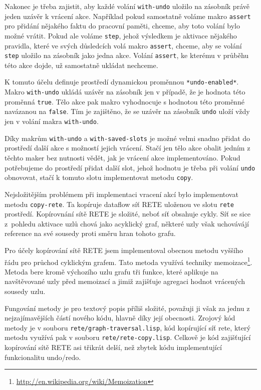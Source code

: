 Nakonec je třeba zajistit, aby každé volání \verb|with-undo| uložilo na zásobník
právě jeden uzávěr k vrácení akce. Například pokud samostatně voláme makro
\verb|assert| pro přidání nějakého faktu do pracovní paměti, chceme, aby toto volání
bylo možné vrátit. Pokud ale voláme \verb|step|, jehož výsledkem je aktivace
nějakého pravidla, které ve svých důsledcích volá makro \verb|assert|, chceme,
aby se volání \verb|step| uložilo na zásobník jako jedna akce. Volání
\verb|assert|, ke kterému v průběhu této akce dojde, už samostatně ukládat
nechceme.

K tomuto účelu definuje prostředí dynamickou proměnnou \verb|*undo-enabled*|.
Makro \verb|with-undo| ukládá uzávěr na zásobník jen v případě, že je hodnota
této proměnná \verb|true|. Tělo akce pak makro vyhodnocuje s hodnotou této
proměnné navázanou na \verb|false|. Tím je zajištěno, že se uzávěr na zásobník
\verb|undo| uloží vždy jen v  volání makra \verb|with-undo|.

Díky makrům \verb|with-undo| a \verb|with-saved-slots| je možné velmi snadno
přidat do prostředí další akce s možností jejich vrácení. Stačí jen tělo akce
obalit jedním z těchto maker bez nutnosti vědět, jak je vrácení akce
implementováno. Pokud potřebujeme do prostředí přidat další slot, jehož hodnotu
je třeba při volání \verb|undo| obnovovat, stačí k tomuto slotu implementovat
metodu \verb|copy|.

Nejsložitějším problémem při implementaci vracení akcí bylo implementovat metodu
\verb|copy-rete|. Ta kopíruje dataflow síť RETE uloženou ve slotu \verb|rete|
prostředí. Kopírovnání sítě RETE je složité, neboť síť obsahuje cykly. Síť se
sice z~pohledu aktivace uzlů chová jako acyklický graf, některé uzly však
uchovávájí reference na své sousedy proti směru hran tohoto grafu.

Pro účely kopírování sítě RETE jsem implementoval obecnou metodu vyššího řádu
pro průchod cyklickým grafem. Tato metoda využívá techniky
memoizace\footnote{\url{http://en.wikipedia.org/wiki/Memoization}}. Metoda bere
kromě výchozího uzlu grafu tři funkce, které aplikuje na navštěvované uzly před
memoizací a jimiž zajišťuje agregaci hodnot vrácených sousedy uzlu.

Fungování metody je pro textový popis příliš složité, považuji ji však za jednu
z nejzajímavějších částí nového kódu, hlavně díky její obecnosti. Zrojový kód
metody je v souboru \verb|rete/graph-traversal.lisp|, kód kopírující síť rete,
který metodu využívá pak v souboru \verb|rete/rete-copy.lisp|. Celkově je kód
zajišťující kopírování sítě RETE asi třikrát delší, než zbytek kódu
implementující funkcionalitu undo/redo.
